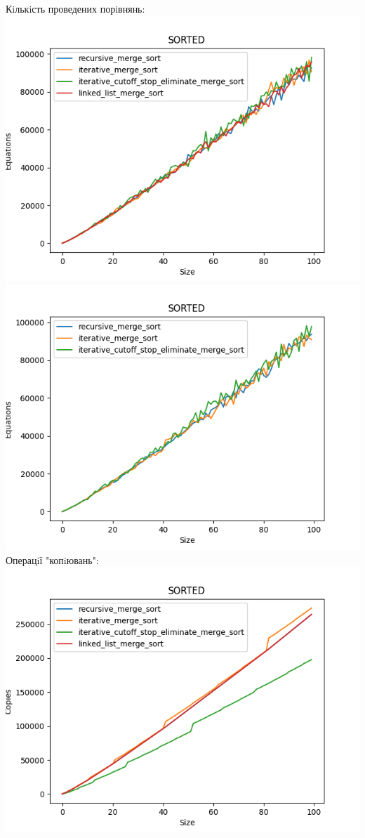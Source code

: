 \documentclass{article}
\begin{document}
        \indent \indent \indent Кiлькiсть проведених порiвнянь:
        \newline
            \includegraphics[scale=0.5]{sorted_Equations_4_sorts.png}
            \includegraphics[scale=0.5]{sorted_Equations_3_sorts.png}
        \newpage
        \indent \indent \indent Операцiї "копiювань":
        \newline
            \includegraphics[scale=0.5]{sorted_Copies_4_sorts.png}
\end{document}
